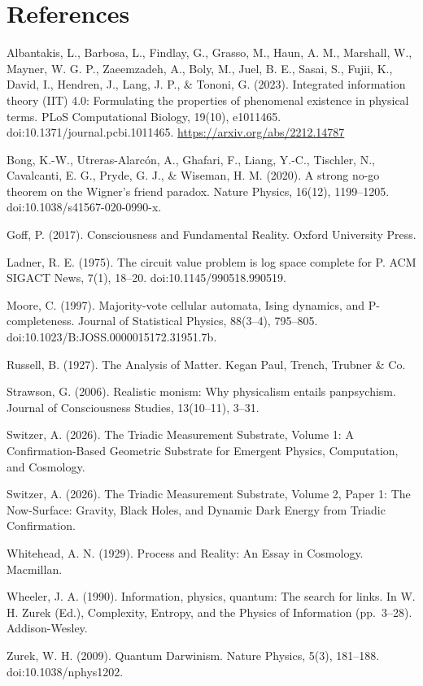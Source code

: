 \documentclass[11pt,oneside]{report}
\theoremstyle{definition}
\theoremstyle{remark}
\newenvironment{reflist}
  {\par\small\setlength{\parindent}{0pt}%
   \setlength{\leftskip}{1.6em}\setlength{\parindent}{-1.6em}%
   \setlength{\parskip}{0.4em}%
   \raggedright\hyphenpenalty=50\exhyphenpenalty=50\relax
   \sloppy}
  {\par}
\begin{document}
\section*{References}
\begin{reflist}
Albantakis, L., Barbosa, L., Findlay, G., Grasso, M., Haun, A. M.,
Marshall, W., Mayner, W. G. P., Zaeemzadeh, A., Boly, M., Juel, B. E.,
Sasai, S., Fujii, K., David, I., Hendren, J., Lang, J. P., \& Tononi, G.
(2023). Integrated information theory (IIT) 4.0: Formulating the
properties of phenomenal existence in physical terms. PLoS Computational
Biology, 19(10), e1011465. doi:10.1371/journal.pcbi.1011465.
\url{https://arxiv.org/abs/2212.14787}

Bong, K.-W., Utreras-Alarc\'on, A., Ghafari, F., Liang, Y.-C., Tischler,
N., Cavalcanti, E. G., Pryde, G. J., \& Wiseman, H. M. (2020). A strong
no-go theorem on the Wigner's friend paradox. Nature Physics, 16(12),
1199--1205. doi:10.1038/s41567-020-0990-x.

Goff, P. (2017). Consciousness and Fundamental Reality. Oxford University
Press.

Ladner, R. E. (1975). The circuit value problem is log space complete for
P. ACM SIGACT News, 7(1), 18--20. doi:10.1145/990518.990519.

Moore, C. (1997). Majority-vote cellular automata, Ising dynamics, and
P-completeness. Journal of Statistical Physics, 88(3--4), 795--805.
doi:10.1023/B:JOSS.0000015172.31951.7b.

Russell, B. (1927). The Analysis of Matter. Kegan Paul, Trench, Trubner
\& Co.

Strawson, G. (2006). Realistic monism: Why physicalism entails
panpsychism. Journal of Consciousness Studies, 13(10--11), 3--31.

Switzer, A. (2026). The Triadic Measurement Substrate, Volume 1: A
Confirmation-Based Geometric Substrate for Emergent Physics, Computation,
and Cosmology.

Switzer, A. (2026). The Triadic Measurement Substrate, Volume 2, Paper 1:
The Now-Surface: Gravity, Black Holes, and
Dynamic Dark Energy from Triadic Confirmation.

Whitehead, A. N. (1929). Process and Reality: An Essay in Cosmology.
Macmillan.

Wheeler, J. A. (1990). Information, physics, quantum: The search for
links. In W. H. Zurek (Ed.), Complexity, Entropy, and the Physics of
Information (pp.~3--28). Addison-Wesley.

Zurek, W. H. (2009). Quantum Darwinism. Nature Physics, 5(3), 181--188.
doi:10.1038/nphys1202.
\end{reflist}

\clearpage
\end{document}
